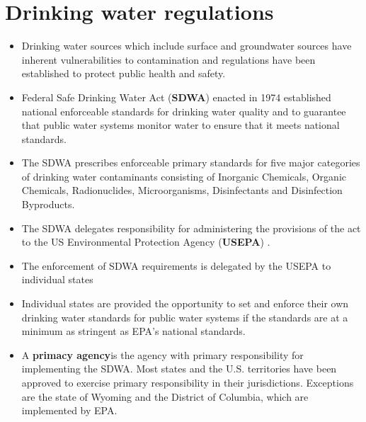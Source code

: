 \newpage






















\section{Drinking water regulations}
\begin{itemize}
\item Drinking water sources which include surface and groundwater sources have inherent vulnerabilities to contamination and regulations have been established to protect public health and safety.
\item Federal Safe Drinking Water Act (\textbf{SDWA})  enacted in 1974 established national enforceable standards for drinking water quality and to guarantee that public water systems monitor water to ensure that it meets national standards. \\
\item The SDWA prescribes enforceable primary standards for five major categories of drinking water contaminants consisting of Inorganic Chemicals, Organic Chemicals, Radionuclides, Microorganisms, Disinfectants and Disinfection Byproducts.
\item The SDWA delegates responsibility for administering the provisions of
the act to the US Environmental Protection Agency (\textbf{USEPA}) .
\item The enforcement of SDWA requirements is delegated by the USEPA to individual states
\item Individual states are provided the opportunity to set and enforce their own drinking water standards for public water systems if the standards are at a minimum as stringent as EPA's national standards.
\item A \textbf{primacy agency}is the agency with primary responsibility for implementing the SDWA. Most states and the U.S. territories have been approved to exercise primary responsibility in their jurisdictions. Exceptions are the state of Wyoming and the District of Columbia, which are implemented by EPA. 

\end{itemize}
